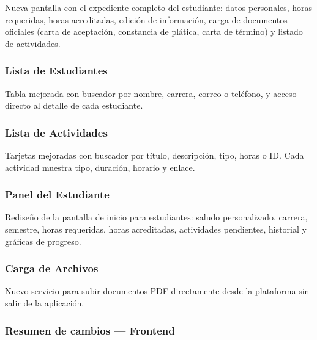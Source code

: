\documentclass[
]{article}
\begin{document}
Nueva pantalla con el expediente completo del estudiante: datos
personales, horas requeridas, horas acreditadas, edición de información,
carga de documentos oficiales (carta de aceptación, constancia de
plática, carta de término) y listado de actividades.

\subsubsection{Lista de Estudiantes}\label{lista-de-estudiantes}

Tabla mejorada con buscador por nombre, carrera, correo o teléfono, y
acceso directo al detalle de cada estudiante.

\subsubsection{Lista de Actividades}\label{lista-de-actividades}

Tarjetas mejoradas con buscador por título, descripción, tipo, horas o
ID. Cada actividad muestra tipo, duración, horario y enlace.

\subsubsection{Panel del Estudiante}\label{panel-del-estudiante}

Rediseño de la pantalla de inicio para estudiantes: saludo
personalizado, carrera, semestre, horas requeridas, horas acreditadas,
actividades pendientes, historial y gráficas de progreso.

\subsubsection{Carga de Archivos}\label{carga-de-archivos}

Nuevo servicio para subir documentos PDF directamente desde la
plataforma sin salir de la aplicación.

\subsubsection{Resumen de cambios ---
Frontend}\label{resumen-de-cambios-frontend}
\end{document}
